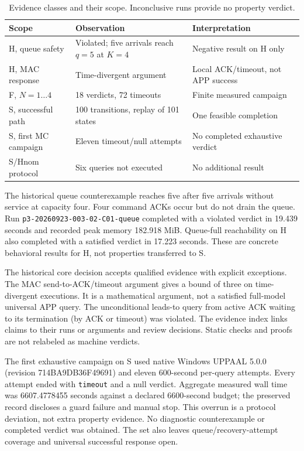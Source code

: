 \documentclass[runningheads]{llncs}
\newcommand{\code}[1]{\texttt{#1}}
\begin{document}
\begin{table}[t]
\caption{Evidence classes and their scope. Inconclusive runs provide no property verdict.}\label{tab:evidence}
\centering\small
\begin{tabularx}{\textwidth}{@{}lXX@{}}
\toprule Scope & Observation & Interpretation\\\midrule
H, queue safety & Violated; five arrivals reach $q=5$ at $K=4$ & Negative result on H only\\
H, MAC response & Time-divergent argument & Local ACK/timeout, not APP success\\
F, $N=1\ldots4$ & 18 verdicts, 72 timeouts & Finite measured campaign\\
S, successful path & 100 transitions, replay of 101 states & One feasible completion\\
S, first MC campaign & Eleven timeout/null attempts & No completed exhaustive verdict\\
S/Hnom protocol & Six queries not executed & No additional result\\\bottomrule
\end{tabularx}
\end{table}

The historical queue counterexample reaches five after five arrivals without service at capacity four. Four command ACKs occur but do not drain the queue. Run \code{p3-20260923-003-02-C01-queue} completed with a violated verdict in 19.439 seconds and recorded peak memory 182.918 MiB. Queue-full reachability on H also completed with a satisfied verdict in 17.223 seconds. These are concrete behavioral results for H, not properties transferred to S.

The historical core decision accepts qualified evidence with explicit exceptions. The MAC send-to-ACK/timeout argument gives a bound of three on time-divergent executions. It is a mathematical argument, not a satisfied full-model universal APP query. The unconditional leads-to query from active ACK waiting to its termination (by ACK or timeout) was violated. The evidence index links claims to their runs or arguments and review decisions. Static checks and proofs are not relabeled as machine verdicts.

The first exhaustive campaign on S used native Windows UPPAAL 5.0.0 (revision 714BA9DB36F49691) and eleven 600-second per-query attempts. Every attempt ended with \code{timeout} and a null verdict. Aggregate measured wall time was 6607.4778455 seconds against a declared 6600-second budget; the preserved record discloses a guard failure and manual stop. This overrun is a protocol deviation, not extra property evidence. No diagnostic counterexample or completed verdict was obtained. The set also leaves queue/recovery-attempt coverage and universal successful response open.
\end{document}
